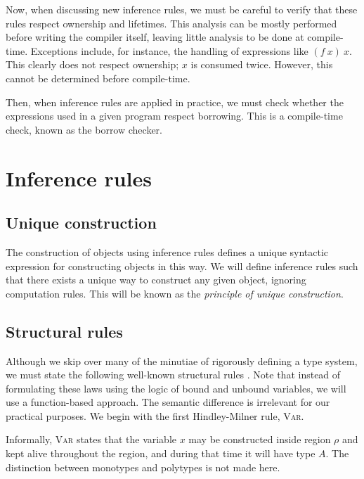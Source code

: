 \documentclass[11pt]{book}
\begin{document}
Now, when discussing new inference rules, we must be careful to verify that these rules respect ownership and lifetimes.
This analysis can be mostly performed before writing the compiler itself, leaving little analysis to be done at compile-time.
Exceptions include, for instance, the handling of expressions like \( (f\ x)\ x \).
This clearly does not respect ownership; \( x \) is consumed twice.
However, this cannot be determined before compile-time.

Then, when inference rules are applied in practice, we must check whether the expressions used in a given program respect borrowing.
This is a compile-time check, known as the borrow checker.

\section{Inference rules}

\subsection{Unique construction}

The construction of objects using inference rules defines a unique syntactic expression for constructing objects in this way.
We will define inference rules such that there exists a unique way to construct any given object, ignoring computation rules.
This will be known as the \textit{principle of unique construction}.

\subsection{Structural rules}

Although we skip over many of the minutiae of rigorously defining a type system, we must state the following well-known structural rules \cite{hottbook}.
Note that instead of formulating these laws using the logic of bound and unbound variables, we will use a function-based approach.
The semantic difference is irrelevant for our practical purposes.
We begin with the first Hindley-Milner rule, \textsc{Var}.
\begin{mathpar}
\end{mathpar}
Informally, \textsc{Var} states that the variable \( x \) may be constructed inside region \( \rho \) and kept alive throughout the region, and during that time it will have type \( A \).
The distinction between monotypes and polytypes is not made here.
\end{document}
